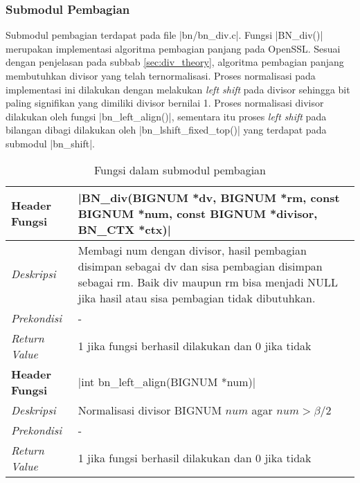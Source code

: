 \subsubsection{Submodul Pembagian}
  Submodul pembagian terdapat pada file |bn/bn_div.c|. Fungsi |BN_div()| merupakan implementasi algoritma pembagian panjang pada OpenSSL. Sesuai dengan penjelasan pada subbab \ref{sec:div_theory}, algoritma pembagian panjang membutuhkan divisor yang telah ternormalisasi. Proses normalisasi pada implementasi ini dilakukan dengan melakukan \textit{left shift} pada divisor sehingga bit paling signifikan yang dimiliki divisor bernilai 1. Proses normalisasi divisor dilakukan oleh fungsi |bn_left_align()|, sementara itu proses \textit{left shift} pada bilangan dibagi dilakukan oleh |bn_lshift_fixed_top()| yang terdapat pada submodul |bn_shift|.

  \begin{table}[h]
    \caption{Fungsi dalam submodul pembagian}
    \begin{tabular}{R{2.8cm}L{10.5cm}}
      \toprule
      \textbf{Header Fungsi} & |BN_div(BIGNUM *dv, BIGNUM *rm, const BIGNUM *num, const BIGNUM *divisor, BN_CTX *ctx)|                                                                                                       \\ \midrule
      \textit{Deskripsi}     & Membagi num dengan divisor, hasil pembagian disimpan sebagai dv dan sisa pembagian disimpan sebagai rm. Baik div maupun rm bisa menjadi NULL jika hasil atau sisa pembagian tidak dibutuhkan. \\
      \textit{Prekondisi}    & - \\
      \textit{Return Value}  & 1 jika fungsi berhasil dilakukan dan 0 jika tidak
      \\ \bottomrule
      \textbf{Header Fungsi} & |int bn_left_align(BIGNUM *num)|                                                                                                                                                              \\ \midrule
      \textit{Deskripsi}     & Normalisasi divisor BIGNUM $num$ agar $num > \beta/2$  \\
      \textit{Prekondisi}    & - \\
      \textit{Return Value}  & 1 jika fungsi berhasil dilakukan dan 0 jika tidak
      \\ \bottomrule
    \end{tabular}
  \end{table}
